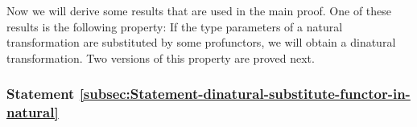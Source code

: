 \begin{comment}
\paragraph{9) Use recursion}

Here the \textsf{``}\lstinline!expression!\textsf{''} is the value of the function
$t$ itself, so the code of $t$ is $t\triangleq p^{:P^{A,A}}\rightarrow\overline{t}$
(the overline in $\overline{t}$ denotes the recursive use of $t$).
We treat $\overline{t}$ as just code for some function that is already
known (by the inductive assumption) to obey its naturality law. Assume
that the type of $t$ is $P^{A,A}\rightarrow Q^{A,A}$; then the recursive
invocation $\overline{t}$ has the type $Q^{A,A}$ (which is a recursive
type assumed to be equivalent to $P^{A,A}\rightarrow Q^{A,A}$). The
naturality law of $t$ applied to an arbitrary $p^{:P^{B,A}}$ is
\[
p\triangleright f^{\downarrow P}\bef t\bef f^{\uparrow Q}\overset{?}{=}p\triangleright f^{\uparrow P}\bef t\bef f^{\downarrow Q}\quad.
\]
Substituting $t=p\rightarrow\overline{t}$, we find
\[
p\triangleright f^{\downarrow P}\triangleright(p\rightarrow\overline{t})\triangleright f^{\uparrow Q}=\overline{t}\triangleright f^{\uparrow Q}\overset{?}{=}p\triangleright f^{\uparrow P}\triangleright(p\rightarrow\overline{t})\triangleright f^{\downarrow Q}=\overline{t}\triangleright f^{\downarrow Q}\quad.
\]
It remains to show that 
\[
\overline{t}\triangleright f^{\uparrow Q}\overset{?}{=}\overline{t}\triangleright f^{\downarrow Q}\quad.
\]
This is the \textsf{``}wedge law\textsf{''} of $\overline{t}$, which follows from
the assumed dinaturality of $\overline{t}$ by Statement~\ref{subsec:Statement-dinatural-expression-wedge-law}.

This concludes the proof of what is commonly known as \textsf{``}the\textsf{''} parametricity
theorem: Any fully parametric function with a type parameter will
automatically satisfy a naturality law. For functions having several
type parameters, we can fix all the type parameters except one and
apply the parametricity theorem to obtain a separate naturality law
for each type parameter.
\end{comment}

Now we will derive some results that are used in the main proof. One
of these results is the following property: If the type parameters
of a natural transformation are substituted by some profunctors, we
will obtain a dinatural transformation. Two versions of this property
are proved next.

\subsubsection{Statement \label{subsec:Statement-dinatural-substitute-functor-in-natural}\ref{subsec:Statement-dinatural-substitute-functor-in-natural}}

